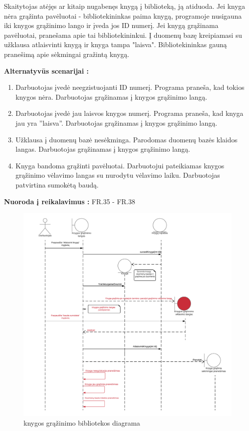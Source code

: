 \documentclass{VUMIFPSkursinis}
\begin{document}
Skaitytojas atėjęs ar kitaip nugabenęs knygą į biblioteką, ją atiduoda. Jei knyga nėra grąžinta pavėluotai - bibliotekininkas paima knygą, programoje nusigauna iki knygos grąžinimo lango ir įveda jos ID numerį. Jei knygą grąžinama pavėluotai, pranešama apie tai bibliotekininkui. Į duomenų bazę kreipiamasi su užklausa atlaisvinti knygą ir knyga tampa "laisva". Bibliotekininkas gauną pranešimą apie sėkmingai gražintą knygą. 

	\textbf{Alternatyvūs scenarijai :}

	\begin{enumerate}
	\item Darbuotojas įvedė neegzistuojanti ID numerį. Programa praneša, kad tokios knygos nėra. Darbuotojas grąžinamas į knygos grąžinimo langą.
    
 	\item Darbuotojas įvedė jau laisvos knygos numerį. Programa praneša, kad knyga jau yra ”laisva”. Darbuotojas grąžinamas į knygos grąžinimo langą.
    
	\item Užklausa į duomenų bazė nesėkminga. Parodomas duomenų bazės klaidos langas. Darbuotojas grąžinamas į knygos grąžinimo langą.
    
    \item Knyga bandoma grąžinti pavėluotai. Darbuotojui pateikiamas knygos grąžinimo vėlavimo langas su nurodytu vėlavimo laiku. Darbuotojas patvirtina sumokėtą baudą.
  	 \end{enumerate}  
 	\textbf {Nuoroda į reikalavimus :} FR.35 - FR.38

\begin{figure}[H] 
    \label{fig:bookretdiag}
    \centering
    \includegraphics[width=1.1\textwidth]{Sekos_diagramos/grazinti_knyga_seq_diag}
    \caption{knygos grąžinimo bibliotekos diagrama}
\end{figure}
\end{document}
